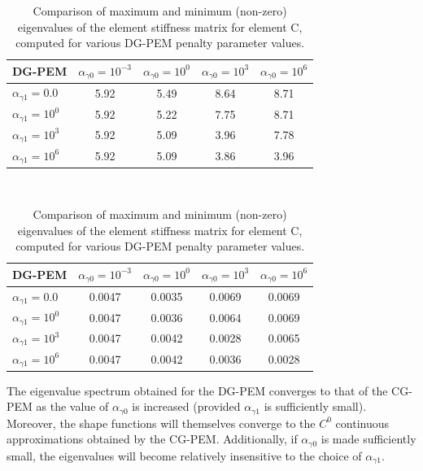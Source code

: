 \begin{table}
\centering
\begin{subtable}{1.0\textwidth}
\centering
\begin{tabular}{| l || c | c | c | c |}
    \hline
DG-PEM & $\alpha_{\gamma0} = 10^{-3}$ & $\alpha_{\gamma0} = 10^{0}$ & $\alpha_{\gamma0} = 10^{3}$ & $\alpha_{\gamma0} = 10^{6}$ \\ \hline \hline
$\alpha_{\gamma1} = 0.0$	& 5.92 & 5.49 & 8.64 & 8.71 \\ \hline
$\alpha_{\gamma1} = 10^{0}$ & 5.92 & 5.22 & 7.75 & 8.71 \\ \hline
$\alpha_{\gamma1} = 10^{3}$ & 5.92 & 5.09 & 3.96 & 7.78 \\ \hline
$\alpha_{\gamma1} = 10^{6}$ & 5.92 & 5.09 & 3.86 & 3.96 \\
    \hline
    \end{tabular}
    \caption{Largest eigenvalue: $\lambda_{\max}$}
    \label{tab:concave_stiffness_max_eigenvalue_parameter_study}
\end{subtable}%
\\
\begin{subtable}{1.0\textwidth}
\centering
\begin{tabular}{| l || c | c | c | c |}
    \hline
DG-PEM & $\alpha_{\gamma0} = 10^{-3}$	&	$\alpha_{\gamma0} = 10^{0}$	&	$\alpha_{\gamma0} = 10^{3}$	&	$\alpha_{\gamma0} = 10^{6}$ \\ \hline \hline
$\alpha_{\gamma1} = 0.0$	&	0.0047	&	0.0035	&	0.0069	&	0.0069 \\ \hline
$\alpha_{\gamma1} = 10^{0}$	&	0.0047	&	0.0036	&	0.0064	&	0.0069 \\ \hline
$\alpha_{\gamma1} = 10^{3}$	&	0.0047	&	0.0042	&	0.0028	&	0.0065 \\ \hline
$\alpha_{\gamma1} = 10^{6}$	&	0.0047 &	0.0042	&	0.0036	&	0.0028 \\
    \hline
    \end{tabular}
    \caption{Smallest (non-zero) eigenvalue: $\lambda_{\min}$}
    \label{tab:concave_stiffness_min_eigenvalue_parameter_study}
\end{subtable}

\caption{Comparison of maximum and minimum (non-zero) eigenvalues of the element stiffness matrix for element C, computed for various DG-PEM penalty parameter values.}
\label{tab:concave_stiffness_max_min_eigenvalue_parameter_study}
\end{table}

The eigenvalue spectrum obtained for the DG-PEM converges to that of the CG-PEM as the value of $\alpha_{\gamma0}$ is increased (provided $\alpha_{\gamma1}$ is sufficiently small). Moreover, the shape functions will themselves converge to the $C^0$ continuous approximations obtained by the CG-PEM. Additionally, if $\alpha_{\gamma0}$ is made sufficiently small, the eigenvalues will become relatively insensitive to the choice of $\alpha_{\gamma1}$. 

